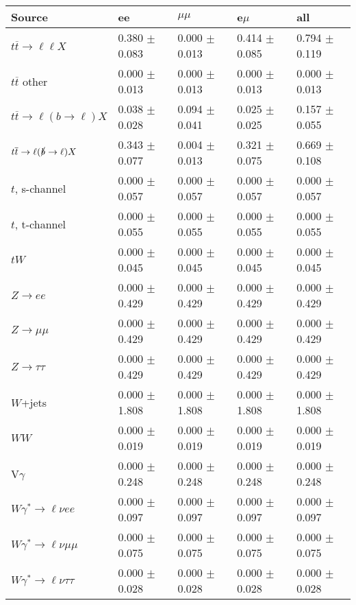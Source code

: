 \begin{tabular}{l | l l l l}
\hline\hline
 Source  &  ee  &  $\mu\mu$  &  e$\mu$  &  all \\
\hline
$t\overline{t}\rightarrow \ell\ell X$ &  0.380 $\pm$  0.083 &  0.000 $\pm$  0.013 &  0.414 $\pm$  0.085 &  0.794 $\pm$  0.119\\
$t\overline{t}$ other &  0.000 $\pm$  0.013 &  0.000 $\pm$  0.013 &  0.000 $\pm$  0.013 &  0.000 $\pm$  0.013\\
$t\overline{t}\rightarrow \ell(b\rightarrow \ell)X$ &  0.038 $\pm$  0.028 &  0.094 $\pm$  0.041 &  0.025 $\pm$  0.025 &  0.157 $\pm$  0.055\\
$t\overline{t}\rightarrow \ell(\slashed{b}\rightarrow \ell)X$ &  0.343 $\pm$  0.077 &  0.004 $\pm$  0.013 &  0.321 $\pm$  0.075 &  0.669 $\pm$  0.108\\
\hline
$t$, s-channel &  0.000 $\pm$  0.057 &  0.000 $\pm$  0.057 &  0.000 $\pm$  0.057 &  0.000 $\pm$  0.057\\
$t$, t-channel &  0.000 $\pm$  0.055 &  0.000 $\pm$  0.055 &  0.000 $\pm$  0.055 &  0.000 $\pm$  0.055\\
$tW$ &  0.000 $\pm$  0.045 &  0.000 $\pm$  0.045 &  0.000 $\pm$  0.045 &  0.000 $\pm$  0.045\\
\hline
$Z\rightarrow ee$ &  0.000 $\pm$  0.429 &  0.000 $\pm$  0.429 &  0.000 $\pm$  0.429 &  0.000 $\pm$  0.429\\
$Z\rightarrow\mu\mu$ &  0.000 $\pm$  0.429 &  0.000 $\pm$  0.429 &  0.000 $\pm$  0.429 &  0.000 $\pm$  0.429\\
$Z\rightarrow\tau\tau$ &  0.000 $\pm$  0.429 &  0.000 $\pm$  0.429 &  0.000 $\pm$  0.429 &  0.000 $\pm$  0.429\\
$W$+jets &  0.000 $\pm$  1.808 &  0.000 $\pm$  1.808 &  0.000 $\pm$  1.808 &  0.000 $\pm$  1.808\\
$WW$ &  0.000 $\pm$  0.019 &  0.000 $\pm$  0.019 &  0.000 $\pm$  0.019 &  0.000 $\pm$  0.019\\
\hline
V$\gamma$ &  0.000 $\pm$  0.248 &  0.000 $\pm$  0.248 &  0.000 $\pm$  0.248 &  0.000 $\pm$  0.248\\
$W\gamma^{*}\rightarrow\ell\nu e e$ &  0.000 $\pm$  0.097 &  0.000 $\pm$  0.097 &  0.000 $\pm$  0.097 &  0.000 $\pm$  0.097\\
$W\gamma^{*}\rightarrow\ell\nu\mu\mu$ &  0.000 $\pm$  0.075 &  0.000 $\pm$  0.075 &  0.000 $\pm$  0.075 &  0.000 $\pm$  0.075\\
$W\gamma^{*}\rightarrow\ell\nu\tau\tau$ &  0.000 $\pm$  0.028 &  0.000 $\pm$  0.028 &  0.000 $\pm$  0.028 &  0.000 $\pm$  0.028\\

\end{tabular}
